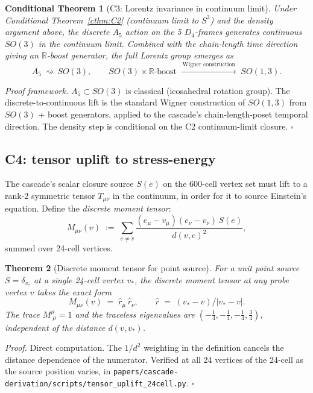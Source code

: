 \documentclass[11pt]{article}
\theoremstyle{plain}
\newtheorem{theorem}{Theorem}[section]
\newtheorem{conditional}[theorem]{Conditional Theorem}
\theoremstyle{definition}
\theoremstyle{remark}
\begin{document}
\begin{conditional}[C3: Lorentz invariance in continuum limit]\label{cthm:C3}
Under Conditional Theorem~\ref{cthm:C2} (continuum limit to $S^3$) and the density argument above, the discrete $A_5$ action on the 5 $D_4$-frames generates continuous $SO(3)$ in the continuum limit. Combined with the chain-length time direction giving an $\mathbb{R}$-boost generator, the full Lorentz group emerges as
\[
  A_5 \,\rightsquigarrow\, SO(3), \qquad SO(3) \times \mathbb{R}\text{-boost} \;\xrightarrow{\,\text{Wigner construction}\,}\; SO(1, 3).
\]
\end{conditional}

\noindent\emph{Proof framework.} $A_5 \subset SO(3)$ is classical (icosahedral rotation group). The discrete-to-continuous lift is the standard Wigner construction of $SO(1,3)$ from $SO(3)$ + boost generators, applied to the cascade's chain-length-poset temporal direction. The density step is conditional on the C2 continuum-limit closure. \hfill$\square$

\subsection{C4: tensor uplift to stress-energy}\label{sec:gravity-C4}

The cascade's scalar closure source $S(e)$ on the 600-cell vertex set must lift to a rank-2 symmetric tensor $T_{\mu\nu}$ in the continuum, in order for it to source Einstein's equation. Define the \emph{discrete moment tensor}:
\begin{equation}\label{eq:moment-tensor}
  M_{\mu\nu}(v) \;:=\; \sum_{e \neq v} \frac{(e_\mu - v_\mu)(e_\nu - v_\nu) \, S(e)}{d(v, e)^2},
\end{equation}
summed over 24-cell vertices.

\begin{theorem}[Discrete moment tensor for point source]\label{thm:moment-tensor}
For a unit point source $S = \delta_{v_*}$ at a single 24-cell vertex $v_*$, the discrete moment tensor at any probe vertex $v$ takes the exact form
\[
  M_{\mu\nu}(v) \;=\; \hat r_\mu \, \hat r_\nu, \qquad \hat r \;=\; (v_* - v)/|v_* - v|.
\]
The trace $M^\mu_{\;\mu} = 1$ and the traceless eigenvalues are $(-\tfrac{1}{4}, -\tfrac{1}{4}, -\tfrac{1}{4}, \tfrac{3}{4})$, independent of the distance $d(v, v_*)$.
\end{theorem}

\noindent\emph{Proof.} Direct computation. The $1/d^2$ weighting in the definition cancels the distance dependence of the numerator. Verified at all 24 vertices of the 24-cell as the source position varies, in \texttt{papers/cascade-derivation/scripts/tensor\_uplift\_24cell.py}. \hfill$\square$
\end{document}
